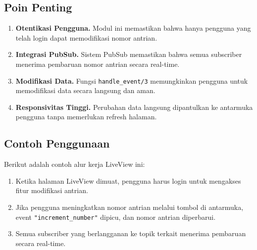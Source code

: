 \subsection{Poin Penting}

\begin{enumerate}
	\item \textbf{Otentikasi Pengguna.} Modul ini memastikan bahwa hanya pengguna yang telah login dapat memodifikasi nomor antrian.
	\item \textbf{Integrasi PubSub.} Sistem PubSub memastikan bahwa semua subscriber menerima pembaruan nomor antrian secara real-time.
	\item \textbf{Modifikasi Data.} Fungsi \texttt{handle\_event/3} memungkinkan pengguna untuk memodifikasi data secara langsung dan aman.
	\item \textbf{Responsivitas Tinggi.} Perubahan data langsung dipantulkan ke antarmuka pengguna tanpa memerlukan refresh halaman.
\end{enumerate}

\subsection{Contoh Penggunaan}

Berikut adalah contoh alur kerja LiveView ini:
\begin{enumerate}
	\item Ketika halaman LiveView dimuat, pengguna harus login untuk mengakses fitur modifikasi antrian.
	\item Jika pengguna meningkatkan nomor antrian melalui tombol di antarmuka, event \texttt{"increment\_number"} dipicu, dan nomor antrian diperbarui.
	\item Semua subscriber yang berlangganan ke topik terkait menerima pembaruan secara real-time.
\end{enumerate}

